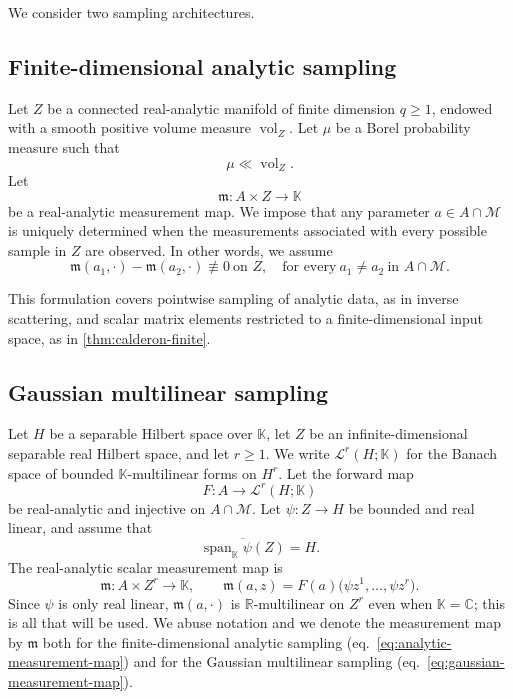 \documentclass[11pt,oneside]{amsart}
\theoremstyle{plain}
\theoremstyle{definition}
\theoremstyle{remark}
\newcommand{\RR}{\mathbb{R}}
\newcommand{\CC}{\mathbb{C}}
\newcommand{\KK}{\mathbb{K}}
\newcommand{\calL}{\mathcal{L}}
\newcommand{\calM}{\mathcal{M}}
\DeclareMathOperator{\vol}{vol}
\begin{document}
We consider two sampling architectures.

\subsection{Finite-dimensional analytic sampling}\label{sec:finite-analytic-sampling}
Let $Z$ be a connected real-analytic manifold of finite dimension $q\geq1$, endowed with a smooth positive volume measure $\vol_Z$. Let $\mu$ be a Borel probability measure such that
\begin{equation}\label{eq:mu-ac}
    \mu\ll \vol_Z.
\end{equation}
Let
\begin{equation}\label{eq:analytic-measurement-map}
    \mathfrak m\colon A\times Z\longrightarrow\KK
\end{equation}
be a real-analytic measurement map. We impose that any parameter $a\in A\cap\calM$ is uniquely determined when the measurements associated with every possible sample in $Z$ are observed. In other words, we assume 
\begin{equation}\label{eq:analytic-separation}
    \mathfrak m(a_1,\cdot)-\mathfrak m(a_2,\cdot)\not\equiv0\ \text{on }Z,\quad\text{for every}~a_1\neq a_2\ \text{in }A\cap\calM.
\end{equation}

This formulation covers pointwise sampling of analytic data, as in inverse scattering, and scalar matrix elements restricted to a finite-dimensional input space, as in \cref{thm:calderon-finite}.

\subsection{Gaussian multilinear sampling}\label{sec:gaussian-sampling}
Let $H$ be a separable Hilbert space over $\KK$, let $Z$ be an infinite-dimensional separable real Hilbert space, and let $r\geq1$. We write $\calL^r(H;\KK)$ for the Banach space of bounded $\KK$-multilinear forms on $H^r$. Let the forward map
\begin{equation}\label{eq:multilinear-forward}
    F\colon A\longrightarrow\calL^r(H;\KK)
\end{equation}
be real-analytic and injective on $A\cap\calM$. Let $\psi\colon Z\to H$ be bounded and real linear, and assume that
\begin{equation}\label{eq:dense-span}
    \overline{\operatorname{span}_{\KK}\psi(Z)}=H.
\end{equation}
The real-analytic scalar measurement map is
\begin{equation}\label{eq:gaussian-measurement-map}
    \mathfrak m\colon A\times Z^r\to \KK,\qquad \mathfrak m(a,z)
    =F(a)\bigl(\psi z^1,\ldots,\psi z^r\bigr).
\end{equation}
Since $\psi$ is only real linear, $\mathfrak m(a,\cdot)$ is $\RR$-multilinear on $Z^r$ even when $\KK=\CC$; this is all that will be used.
We abuse notation and we denote the measurement map by $\mathfrak m$ both for the finite-dimensional analytic sampling (eq.\ \eqref{eq:analytic-measurement-map}) and for the Gaussian multilinear sampling (eq.\ \eqref{eq:gaussian-measurement-map}).
\end{document}
